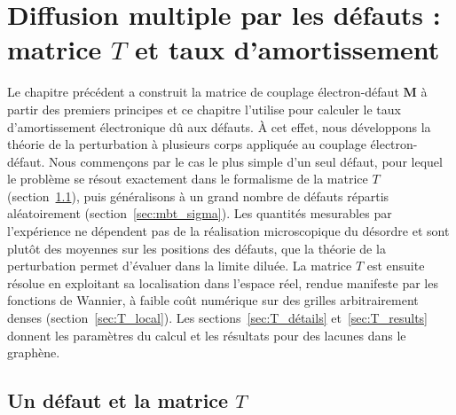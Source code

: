 \chapter{Diffusion multiple par les défauts : matrice $T$ et taux d'amortissement}\label{chap:T}

Le chapitre précédent a construit la matrice de couplage électron-défaut $\bm M$ à partir des premiers principes et ce chapitre l'utilise pour calculer le taux d'amortissement électronique dû aux défauts. À cet effet, nous développons la théorie de la perturbation à plusieurs corps appliquée au couplage électron-défaut. Nous commençons par le cas le plus simple d'un seul défaut, pour lequel le problème se résout exactement dans le formalisme de la matrice $T$~\cite{bruusManyBodyQuantumTheory2004} (section~\ref{sec:mbt_T}), puis généralisons à un grand nombre de défauts répartis aléatoirement (section~\ref{sec:mbt_sigma}). Les quantités mesurables par l'expérience ne dépendent pas de la réalisation microscopique du désordre et sont plutôt des moyennes sur les positions des défauts, que la théorie de la perturbation permet d'évaluer dans la limite diluée. La matrice $T$ est ensuite résolue en exploitant sa localisation dans l'espace réel, rendue manifeste par les fonctions de Wannier, à faible coût numérique sur des grilles arbitrairement denses (section~\ref{sec:T_local}). Les sections~\ref{sec:T_détails} et~\ref{sec:T_results} donnent les paramètres du calcul et les résultats pour des lacunes dans le graphène.

\section{Un défaut et la matrice $T$}\label{sec:mbt_T}

